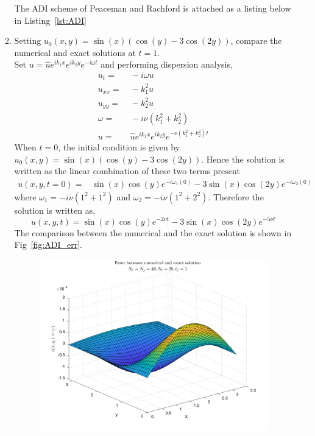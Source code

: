\documentclass[11pt]{article}
\newcommand{\bra}[1]{\left(#1\right)}
\begin{document}
\begin{enumerate}
\begin{enumerate}
      The ADI scheme of Peaceman and Rachford is attached as a listing below in Listing~\ref{lst:ADI}
      
      \item {\color{red}Setting $u_0(x,y)=\sin(x)(\cos(y)-3\cos(2y))$, compare the numerical and exact solutions at $t=1$. } \\
        Set $u = \hat{u}e^{ik_1 x}e^{ik_2 y}e^{-i\omega t}$ and performing dispersion analysis,
        \begin{align*}
        u_t =& \ -i\omega u \\
        u_{xx} =& \ -k^2_1 u \\
        u_{yy} =& \ -k^2_2 u \\
        \omega =&\ -i\nu(k^2_1 + k^2_2) \\
        u =& \ \hat{u}e^{ik_1 x}e^{ik_2 y}e^{-\nu\bra{k^2_1 + k^2_2}t}
        \end{align*}
        When $t=0$, the initial condition is given by $u_0(x,y) = \sin(x)\bra{\cos(y)-3\cos(2y)}$. Hence the solution is written as the linear combination of these two terms present
        \begin{align*}
        u(x,y,t=0) =& \sin(x)\cos(y)e^{-i \omega_1(0)} -3\sin(x)\cos(2y)e^{-i \omega_2(0)}
        \end{align*}
        where $\omega_1 = -i\nu(1^2 + 1^2)$ and $\omega_2 = -i\nu(1^2+2^2)$. Therefore the solution is written as,
        \[
        u(x,y,t) = \sin(x)\cos(y)e^{-2\nu t} -3\sin(x)\cos(2y)e^{-5\nu t}
        \]
        The comparison between the numerical and the exact solution is shown in Fig~\ref{fig:ADI_err}.
        \begin{figure}[htp]
        \centering
        \includegraphics[width=5in]{ADI_ErrPlot.png}

\end{figure}
\end{enumerate}
\end{enumerate}
\end{document}
